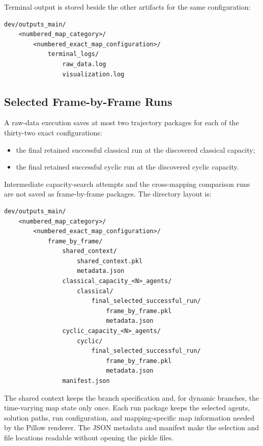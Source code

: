 \documentclass[11pt]{article}
\begin{document}
Terminal output is stored beside the other artifacts for the same configuration:
\begin{lstlisting}
dev/outputs_main/
    <numbered_map_category>/
        <numbered_exact_map_configuration>/
            terminal_logs/
                raw_data.log
                visualization.log
\end{lstlisting}

\subsection{Selected Frame-by-Frame Runs}

A raw-data execution saves at most two trajectory packages for each of the thirty-two exact configurations:
\begin{itemize}[leftmargin=2em]
    \item the final retained successful classical run at the discovered classical capacity;
    \item the final retained successful cyclic run at the discovered cyclic capacity.
\end{itemize}

Intermediate capacity-search attempts and the cross-mapping comparison runs are not saved as frame-by-frame packages. The directory layout is:
\begin{lstlisting}
dev/outputs_main/
    <numbered_map_category>/
        <numbered_exact_map_configuration>/
            frame_by_frame/
                shared_context/
                    shared_context.pkl
                    metadata.json
                classical_capacity_<N>_agents/
                    classical/
                        final_selected_successful_run/
                            frame_by_frame.pkl
                            metadata.json
                cyclic_capacity_<N>_agents/
                    cyclic/
                        final_selected_successful_run/
                            frame_by_frame.pkl
                            metadata.json
                manifest.json
\end{lstlisting}

The shared context keeps the branch specification and, for dynamic branches, the time-varying map state only once. Each run package keeps the selected agents, solution paths, run configuration, and mapping-specific map information needed by the Pillow renderer. The JSON metadata and manifest make the selection and file locations readable without opening the pickle files.
\end{document}
